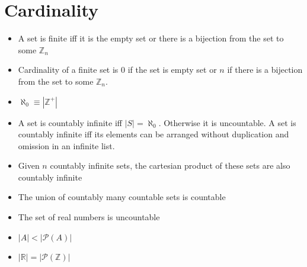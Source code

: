 \documentclass[11pt, twocolumn]{article}
\newenvironment{compactitem}
{\begin{itemize}
  \setlength{\itemsep}{1px}
  \setlength{\parskip}{0pt}
  \setlength{\parsep}{0pt}}
{\end{itemize}}
\begin{document}
\section{Cardinality}
\begin{compactitem}
\item A set is finite iff it is the empty set or there is a bijection from the set to some $\mathbb{Z}_n$
\item Cardinality of a finite set is 0 if the set is empty set or $n$ if there is a bijection from the set to some $\mathbb{Z}_n$.
\item $\aleph_0 \equiv |\mathbb{Z}^+|$
\item A set is countably infinite iff $|S| = \aleph_0$. Otherwise it is uncountable. A set is countably infinite iff its elements can be arranged without duplication and omission in an infinite list.
\item Given $n$ countably infinite sets, the cartesian product of these sets are also countably infinite
\item The union of countably many countable sets is countable
\item The set of real numbers is uncountable
\item $|A|<|\mathcal{P}(A)|$
\item $|\mathbb{R}|=|\mathcal{P}(\mathbb{Z})|$
\end{compactitem}
\end{document}
